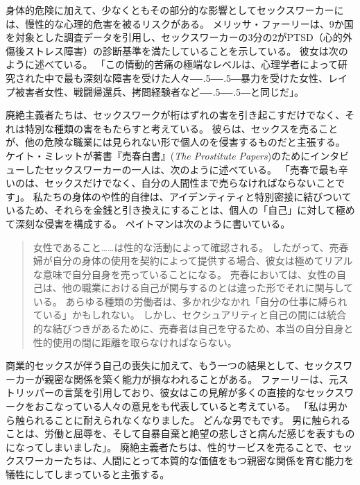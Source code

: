 \documentclass[paper=a4,book,openany]{jlreq}
\def\DDASH{―\kern-.5\zw―\kern-.5\zw―}
\begin{document}
身体的危険に加えて、少なくともその部分的な影響としてセックスワーカーには、慢性的な心理的危害を被るリスクがある。
メリッサ・ファーリーは、9か国を対象とした調査データを引用し、セックスワーカーの3分の2がPTSD（心的外傷後ストレス障害）の診断基準を満たしていることを示している。
彼女は次のように述べている。
「この情動的苦痛の極端なレベルは、心理学者によって研究された中で最も深刻な障害を受けた人々{\DDASH}暴力を受けた女性、レイプ被害者女性、戦闘帰還兵、拷問経験者など{\DDASH}と同じだ」\citep[p.100]{farley18:_risks_prost}。

廃絶主義者たちは、セックスワークが桁はずれの害を引き起こすだけでなく、それは特別な種類の害をもたらすと考えている。
彼らは、セックスを売ることが、他の危険な職業には見られない形で個人のを侵害するものだと主張する。
ケイト・ミレットが著書『売春白書』(\emph{The Prostitute Papers})のためにインタビューしたセックスワーカーの一人は、次のように述べている。
「売春で最も辛いのは、セックスだけでなく、自分の人間性まで売らなければならないことです」\citep[p.84]{millett76:_prost_paper}。
私たちの身体のや性的自律は、アイデンティティと特別密接に結びついているため、それらを金銭と引き換えにすることは、個人の「自己」に対して極めて深刻な侵害を構成する。
ペイトマンは次のように書いている。

\begin{quote}
女性であること……は性的な活動によって確認される。
したがって、売春婦が自分の身体の使用を契約によって提供する場合、彼女は極めてリアルな意味で自分自身を売っていることになる。
売春においては、女性の自己は、他の職業における自己が関与するのとは違った形でそれに関与している。
あらゆる種類の労働者は、多かれ少なかれ「自分の仕事に縛られている」かもしれない。
しかし、セクシュアリティと自己の間には統合的な結びつきがあるために、売春者は自己を守るため、本当の自分自身と性的使用の間に距離を取らなければならない。
\citep{pateman88:_sexual_contr}
\end{quote}

商業的セックスが伴う自己の喪失に加えて、もう一つの結果として、セックスワーカーが親密な関係を築く能力が損なわれることがある。
ファーリーは、元ストリッパーの言葉を引用しており、彼女はこの見解が多くの直接的なセックスワークをおこなっている人々の意見をも代表していると考えている。
「私は男から触られることに耐えられなくなりました。
どんな男でもです。
男に触られることは、労働と屈辱を、そして自暴自棄と絶望の悲しさと病んだ感じを表すものになってしまいました」\citep{farley13:_prost_liber_slaver}。
廃絶主義者たちは、性的サービスを売ることで、セックスワーカーたちは、人間にとって本質的な価値をもつ親密な関係を育む能力を犠牲にしてしまっていると主張する。
\end{document}
